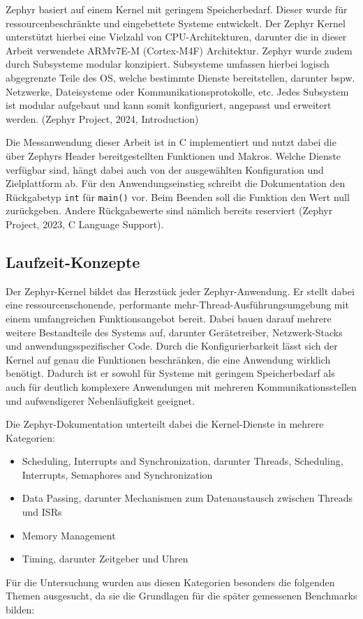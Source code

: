 Zephyr basiert auf einem Kernel mit geringem Speicherbedarf. Dieser wurde f{\"u}r ressourcenbeschr{\"a}nkte und eingebettete Systeme entwickelt. Der Zephyr Kernel unterst{\"u}tzt hierbei eine Vielzahl von CPU-Architekturen, darunter die in dieser Arbeit verwendete ARMv7E-M (Cortex-M4F) Architektur. Zephyr wurde zudem durch Subsysteme modular konzipiert. Subsysteme umfassen hierbei logisch abgegrenzte Teile des OS, welche bestimmte Dienste bereitstellen, darunter bspw. Netzwerke, Dateisysteme oder Kommunikationsprotokolle, etc. Jedes Subsystem ist modular aufgebaut und kann somit konfiguriert, angepasst und erweitert werden. (Zephyr Project, 2024, \glqq{}Introduction\grqq{})

Die Messanwendung dieser Arbeit ist in C implementiert und nutzt dabei die {\"u}ber Zephyrs Header bereitgestellten Funktionen und Makros. Welche Dienste verf{\"u}gbar sind, h{\"a}ngt dabei auch von der ausgew{\"a}hlten Konfiguration und Zielplattform ab. F{\"u}r den Anwendungseinstieg schreibt die Dokumentation den R{\"u}ckgabetyp \lstinline[style=codeinline]|int| f{\"u}r \lstinline[style=codeinline]|main()| vor. Beim Beenden soll die Funktion den Wert null zur{\"u}ckgeben. Andere R{\"u}ckgabewerte sind n{\"a}mlich bereits reserviert (Zephyr Project, 2023, \glqq{}C Language Support\grqq{}).

\subsection{Laufzeit-Konzepte}
Der Zephyr-Kernel bildet das Herzst{\"u}ck jeder Zephyr-Anwendung. Er stellt dabei eine ressourcenschonende, performante mehr-Thread-Ausf{\"u}hrungsumgebung mit einem umfangreichen Funktionsangebot bereit. Dabei bauen darauf mehrere weitere Bestandteile des Systems auf, darunter Ger{\"a}tetreiber, Netzwerk-Stacks und anwendungsspezifischer Code. Durch die Konfigurierbarkeit l{\"a}sst sich der Kernel auf genau die Funktionen beschr{\"a}nken, die eine Anwendung wirklich ben{\"o}tigt. Dadurch ist er sowohl f{\"u}r Systeme mit geringem Speicherbedarf als auch f{\"u}r deutlich komplexere Anwendungen mit mehreren Kommunikationsstellen und aufwendigerer Nebenl{\"a}ufigkeit geeignet.

Die Zephyr-Dokumentation unterteilt dabei die Kernel-Dienste in mehrere Kategorien:

\begin{itemize}
\item \glqq{}Scheduling, Interrupts and Synchronization\grqq{}, darunter Threads, Scheduling, Interrupts, Semaphores and Synchronization
\item \glqq{}Data Passing\grqq{}, darunter Mechanismen zum Datenaustausch zwischen Threads und ISRs
\item \glqq{}Memory Management\grqq{}
\item \glqq{}Timing\grqq{}, darunter Zeitgeber und Uhren
\end{itemize}
F{\"u}r die Untersuchung wurden aus diesen Kategorien besonders die folgenden Themen ausgesucht, da sie die Grundlagen f{\"u}r die sp{\"a}ter gemessenen Benchmarks bilden:

